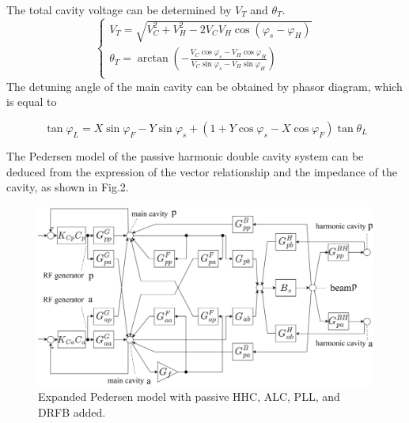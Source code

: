 \documentclass[letterpaper,
               nospread,     %
               ]{jacow}
\begin{document}
The total cavity voltage can be determined by
${{V}_{T}}$ and ${{\theta }_{T}}$.
\begin{equation}\label{eq:label}
   \left\{ \begin{matrix}
      {{V}_{T}}=\sqrt{V_{C}^{2}+V_{H}^{2}-2{{V}_{C}}{{V}_{H}}\cos ({{\varphi }_{s}}-{{\varphi }_{H}})}                                                                            \\
      {{\theta }_{T}}=\arctan \left( -\frac{{{V}_{C}}\cos {{\varphi }_{s}}-{{V}_{H}}\cos {{\varphi }_{H}}}{{{V}_{C}}\sin {{\varphi }_{s}}-{{V}_{H}}\sin {{\varphi }_{H}}} \right) \\
   \end{matrix} \right.
\end{equation}
\hspace*{1em}The detuning angle of the main cavity can be
obtained by phasor diagram, which is equal to
\begin{footnotesize}
   \begin{equation}\label{eq:label}
      \tan {{\varphi }_{L}}=X\sin {{\varphi }_{F}}-Y\sin {{\varphi }_{s}}+\left( 1+Y\cos {{\varphi }_{s}}-X\cos {{\varphi }_{F}} \right)\tan {{\theta }_{L}}
   \end{equation}
\end{footnotesize}
\hspace*{1em}The Pedersen model of the passive harmonic double cavity
system can be deduced from the expression of the vector relationship
and the impedance of the cavity, as shown in Fig.2.
\begin{figure}[!htb]
   \centering
   \includegraphics*[width=1\columnwidth]{THPA037_f2}
   \caption{Expanded Pedersen model with passive HHC, ALC, PLL, and DRFB added.}
   \label{fig:paper_layout}
\end{figure}
\end{document}
